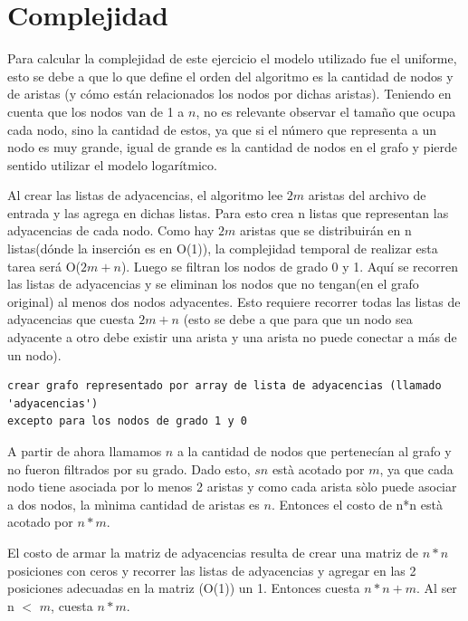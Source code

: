 \documentclass[a4paper,11pt] {article}
\begin{document}

\section*{Complejidad}

Para calcular la complejidad de este ejercicio el modelo utilizado fue el uniforme, esto se debe a que lo que define el orden del algoritmo es la cantidad de nodos y de aristas
(y cómo están relacionados los nodos  por dichas aristas). Teniendo en cuenta que los nodos van de 1 a $n$, no es relevante observar el tamaño que ocupa cada nodo, sino la cantidad de estos, ya que si el número que representa a un nodo es muy grande, igual de grande es la cantidad de nodos en el grafo y pierde sentido utilizar el modelo logarítmico.

\bigskip
Al crear las listas de adyacencias, el algoritmo lee $2m$ aristas del archivo de entrada y las agrega en dichas listas.  Para esto crea n listas que representan las adyacencias de cada nodo. Como hay $2m$ aristas que se distribuirán en n listas(dónde la inserción es en O(1)), la complejidad temporal de realizar esta tarea será O($2m + n$).
Luego se filtran los nodos de grado 0 y 1. Aquí se recorren las listas de adyacencias y  se eliminan los nodos que no tengan(en el grafo original) al menos dos nodos adyacentes. Esto requiere recorrer todas las listas de adyacencias que cuesta $2m + n$ (esto se debe a que para que un nodo sea adyacente a otro debe existir una arista y una arista no puede conectar a más de un nodo).

\begin{verbatim}
crear grafo representado por array de lista de adyacencias (llamado 'adyacencias')
excepto para los nodos de grado 1 y 0
\end{verbatim}

A partir de ahora llamamos $n$ a la cantidad de nodos que pertenecían al grafo y no fueron filtrados por su grado.
Dado esto, $sn$  està acotado por  $m$, ya que cada nodo tiene asociada por lo menos 2 aristas y como cada arista sòlo puede asociar a dos nodos, la mìnima cantidad de aristas es $n$. Entonces el costo de n*n està acotado por $n*m$.

\bigskip

El costo de armar la matriz de adyacencias resulta de crear una matriz de $n*n$ posiciones con ceros y recorrer las listas de adyacencias y agregar en las 2 posiciones adecuadas en la matriz (O(1)) un 1. Entonces cuesta $n*n + m$. Al ser n $<$ $m$, cuesta $n * m$.
\end{document}
